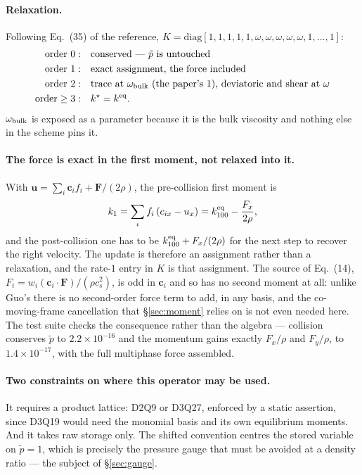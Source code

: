 \documentclass[11pt,a4paper]{article}
\newcommand{\cs}{c_s}
\newcommand{\ci}{\bm{c}_i}
\newcommand{\uu}{\bm{u}}
\newcommand{\e}[1]{\times 10^{#1}}
\begin{document}
\paragraph{Relaxation.} Following Eq.~(35) of the reference,
$K=\mathrm{diag}[1,1,1,1,1,\omega,\omega,\omega,\omega,\omega,1,\ldots,1]$:
\begin{equation}
\begin{aligned}
  \text{order }0:&\quad \text{conserved --- } \tilde p \text{ is untouched} \\
  \text{order }1:&\quad \text{exact assignment, the force included} \\
  \text{order }2:&\quad \text{trace at }\omega_{\rm bulk}\text{ (the paper's }1\text{),
                          deviatoric and shear at }\omega \\
  \text{order}\geq3:&\quad k^{\star} = k^{\rm eq}.
\end{aligned}
\end{equation}
$\omega_{\rm bulk}$ is exposed as a parameter because it is the bulk viscosity and
nothing else in the scheme pins it.

\paragraph{The force is exact in the first moment, not relaxed into it.} With
$\uu=\sum_i\ci f_i + \bm{F}/(2\rho)$, the pre-collision first moment is
\begin{equation}
  k_1 = \sum_i f_i\,(c_{ix}-u_x) = k^{\rm eq}_{100} - \frac{F_x}{2\rho},
  \label{eq:mpk1}
\end{equation}
and the post-collision one has to be $k^{\rm eq}_{100}+F_x/(2\rho)$ for the next
step to recover the right velocity. The update is therefore an assignment rather
than a relaxation, and the rate-$1$ entry in $K$ is that assignment. The source of
Eq.~(14), $F_i = w_i(\ci\!\cdot\!\bm{F})/(\rho\cs^2)$, is odd in $\ci$ and so has
no second moment at all: unlike Guo's there is no second-order force term to add,
in any basis, and the co-moving-frame cancellation that \S\ref{sec:moment} relies
on is not even needed here. The test suite checks the consequence rather than the
algebra --- collision conserves $\tilde p$ to $2.2\e{-16}$ and the momentum gains
exactly $F_x/\rho$ and $F_y/\rho$, to $1.4\e{-17}$, with the full multiphase force
assembled.

\paragraph{Two constraints on where this operator may be used.} It requires a
product lattice: D2Q9 or D3Q27, enforced by a static assertion, since D3Q19 would
need the monomial basis and its own equilibrium moments. And it takes raw storage
only. The shifted convention centres the stored variable on $\tilde p = 1$, which
is precisely the pressure gauge that must be avoided at a density ratio --- the
subject of \S\ref{sec:gauge}.
\end{document}
